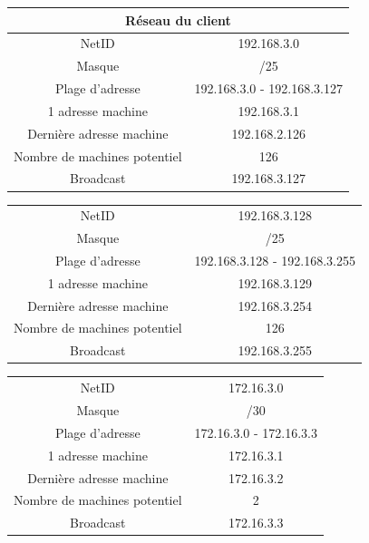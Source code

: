 \documentclass[12pt,a4paper,notitlepage]{article}
\begin{document}
\begin{center}
\begin{tabular}{|c|c|}
  \hline
 \multicolumn{2}{|c|}{\cellcolor{bleup}Réseau du client} \\
  \hline
  NetID & 192.168.3.0 \\
  Masque & /25  \\
  Plage d'adresse & 192.168.3.0 - 192.168.3.127\\
  1\up{ère} adresse machine & 192.168.3.1\\
  Dernière adresse machine & 192.168.2.126\\
  Nombre de machines potentiel & 126\\
  Broadcast & 192.168.3.127\\
  \hline
\end{tabular}
\end{center}

\begin{center}
\begin{tabular}{|c|c|}
  \hline
  \rowcolor{orangec} \multicolumn{2}{|c|}{\cellcolor{bleup}Réseau du seveur} \\
  \hline
  NetID & 192.168.3.128 \\
  Masque & /25  \\
  Plage d'adresse & 192.168.3.128 - 192.168.3.255\\
  1\up{ère} adresse machine & 192.168.3.129\\
  Dernière adresse machine& 192.168.3.254\\
  Nombre de machines potentiel & 126\\
  Broadcast & 192.168.3.255\\
  \hline
\end{tabular}
\end{center}

\begin{center}
\begin{tabular}{|c|c|}
  \hline
  \rowcolor{orangec} \multicolumn{2}{|c|}{\cellcolor{bleup}Réseau de transport} \\
  \hline
  NetID & 172.16.3.0 \\
  Masque & /30  \\
  Plage d'adresse & 172.16.3.0 - 172.16.3.3\\
  1\up{ère} adresse machine & 172.16.3.1\\
  Dernière adresse machine&  172.16.3.2\\
  Nombre de machines potentiel & 2\\
  Broadcast & 172.16.3.3\\
  \hline
\end{tabular}
\end{center}
\end{document}
